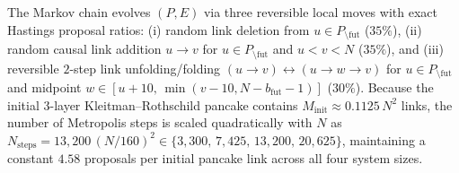 \documentclass[11pt,a4paper]{article}
\theoremstyle{definition}
\theoremstyle{remark}
\begin{document}
The Markov chain evolves $(P, E)$ via three reversible local moves with exact Hastings proposal ratios: (i) random link deletion from $u \in P_{\setminus\mathrm{fut}}$ ($35\%$), (ii) random causal link addition $u \to v$ for $u \in P_{\setminus\mathrm{fut}}$ and $u < v < N$ ($35\%$), and (iii) reversible $2$-step link unfolding/folding $(u \to v) \leftrightarrow (u \to w \to v)$ for $u \in P_{\setminus\mathrm{fut}}$ and midpoint $w \in [u + 10,\, \min(v - 10, N - b_{\mathrm{fut}} - 1)]$ ($30\%$). Because the initial $3$-layer Kleitman--Rothschild pancake contains $M_{\mathrm{init}} \approx 0.1125\,N^2$ links, the number of Metropolis steps is scaled quadratically with $N$ as $N_{\mathrm{steps}} = 13{,}200\,(N/160)^2 \in \{3{,}300,\, 7{,}425,\, 13{,}200,\, 20{,}625\}$, maintaining a constant $4.58$ proposals per initial pancake link across all four system sizes.
\end{document}
